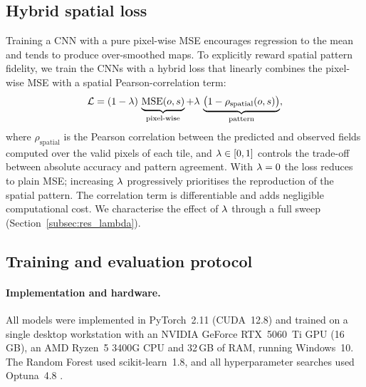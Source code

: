 \subsection{Hybrid spatial loss}
\label{subsec:loss}

Training a CNN with a pure pixel-wise MSE encourages regression to the mean and
tends to produce over-smoothed maps. To explicitly reward spatial pattern
fidelity, we train the CNNs with a hybrid loss that linearly combines the
pixel-wise MSE with a spatial Pearson-correlation term:
%
\begin{equation}
  \mathcal{L} = (1-\lambda)\,\underbrace{\mathrm{MSE}(o,s)}_{\text{pixel-wise}}
  + \lambda\,\underbrace{\big(1-\rho_{\text{spatial}}(o,s)\big)}
  _{\text{pattern}},
  \label{eq:loss}
\end{equation}
%
where $\rho_{\text{spatial}}$ is the Pearson correlation between the predicted
and observed fields computed over the valid pixels of each tile, and
$\lambda\in[0,1]$ controls the trade-off between absolute accuracy and pattern
agreement. With $\lambda=0$ the loss reduces to plain MSE; increasing $\lambda$
progressively prioritises the reproduction of the spatial pattern. The
correlation term is differentiable and adds negligible computational cost. We
characterise the effect of $\lambda$ through a full sweep
(Section~\ref{subsec:res_lambda}).

\subsection{Training and evaluation protocol}
\label{subsec:protocol}

\paragraph{Implementation and hardware.}
All models were implemented in PyTorch~2.11 (CUDA~12.8) and trained on a single
desktop workstation with an NVIDIA GeForce RTX~5060~Ti GPU (16\,GB), an AMD
Ryzen~5 3400G CPU and 32\,GB of RAM, running Windows~10. The Random Forest used
scikit-learn~1.8, and all hyperparameter searches used Optuna~4.8
\citep{akiba2019}.

